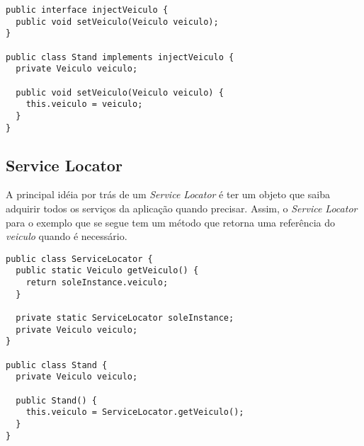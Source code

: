 \begin{lstlisting}[caption=Injeção pela Interface]
public interface injectVeiculo {
  public void setVeiculo(Veiculo veiculo);
}

public class Stand implements injectVeiculo {
  private Veiculo veiculo;

  public void setVeiculo(Veiculo veiculo) {
    this.veiculo = veiculo;
  }
}
\end{lstlisting}

\subsection{Service Locator}
A principal idéia por trás de um \textit{Service Locator} é ter um objeto que saiba adquirir todos os serviços da aplicação quando precisar. Assim, o \textit{Service Locator} para o exemplo que se segue tem um método que retorna uma referência do \textit{veiculo} quando é necessário.

\begin{lstlisting}[caption=Injeção por Service Locator]
public class ServiceLocator {
  public static Veiculo getVeiculo() {
    return soleInstance.veiculo;
  }

  private static ServiceLocator soleInstance;
  private Veiculo veiculo;
}

public class Stand {
  private Veiculo veiculo;

  public Stand() {
    this.veiculo = ServiceLocator.getVeiculo();
  }
}
\end{lstlisting}
